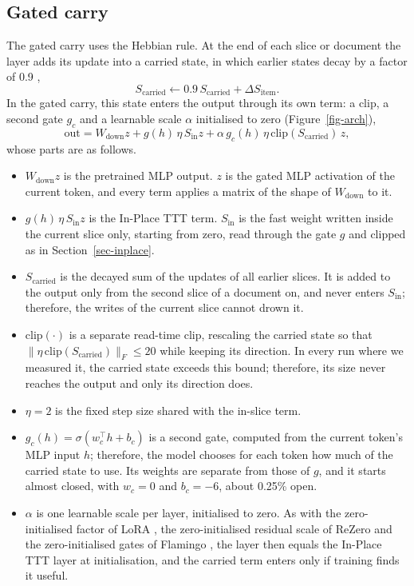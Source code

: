 \documentclass[12pt,a4paper]{report}
\begin{document}
\subsection{Gated carry}
\label{sec-gated}
The gated carry uses the Hebbian rule. At the end of each slice or document the layer adds its update into a carried state, in which earlier states decay by a factor of 0.9 \citep{ba2016using},
\begin{equation}
  S_{\mathrm{carried}} \leftarrow 0.9\, S_{\mathrm{carried}} + \Delta S_{\mathrm{item}} .
\end{equation}
In the gated carry, this state enters the output through its own term: a clip, a second gate $g_c$ and a learnable scale $\alpha$ initialised to zero (Figure~\ref{fig-arch}),
\begin{equation}
  \mathrm{out} = W_{\mathrm{down}} z + g(h)\, \eta\, S_{\mathrm{in}} z + \alpha\, g_c(h)\, \eta\, \mathrm{clip}(S_{\mathrm{carried}})\, z ,
\end{equation}
whose parts are as follows.
\begin{itemize}
  \item $W_{\mathrm{down}} z$ is the pretrained MLP output. $z$ is the gated MLP activation of the current token, and every term applies a matrix of the shape of $W_{\mathrm{down}}$ to it.
  \item $g(h)\, \eta\, S_{\mathrm{in}} z$ is the In-Place TTT term. $S_{\mathrm{in}}$ is the fast weight written inside the current slice only, starting from zero, read through the gate $g$ and clipped as in Section~\ref{sec-inplace}.
  \item $S_{\mathrm{carried}}$ is the decayed sum of the updates of all earlier slices. It is added to the output only from the second slice of a document on, and never enters $S_{\mathrm{in}}$; therefore, the writes of the current slice cannot drown it.
  \item $\mathrm{clip}(\cdot)$ is a separate read-time clip, rescaling the carried state so that $\lVert \eta\, \mathrm{clip}(S_{\mathrm{carried}}) \rVert_F \le 20$ while keeping its direction. In every run where we measured it, the carried state exceeds this bound; therefore, its size never reaches the output and only its direction does.
  \item $\eta = 2$ is the fixed step size shared with the in-slice term.
  \item $g_c(h) = \sigma(w_c^\top h + b_c)$ is a second gate, computed from the current token's MLP input $h$; therefore, the model chooses for each token how much of the carried state to use. Its weights are separate from those of $g$, and it starts almost closed, with $w_c = 0$ and $b_c = -6$, about 0.25\% open.
  \item $\alpha$ is one learnable scale per layer, initialised to zero. As with the zero-initialised factor of LoRA \citep{hu2022lora}, the zero-initialised residual scale of ReZero \citep{bachlechner2021rezero} and the zero-initialised gates of Flamingo \citep{alayrac2022flamingo}, the layer then equals the In-Place TTT layer at initialisation, and the carried term enters only if training finds it useful.
\end{itemize}
\end{document}
